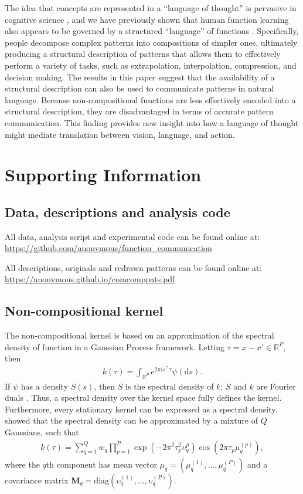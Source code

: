 \documentclass[a4paper,man, floatsintext, natbib]{apa6}
\begin{document}
The idea that concepts are represented in a ``language of thought'' is pervasive in cognitive science \citep{fodor1975language,piantadosi2016logical}, and we have previously shown that human function learning also appears to be governed by a structured ``language'' of functions \citep{schulz2017compositional,gershman2017structured}. Specifically, people decompose complex patterns into compositions of simpler ones, ultimately producing a structural description of patterns that allows them to effectively perform a variety of tasks, such as extrapolation, interpolation, compression, and decision making. The results in this paper suggest that the availability of a structural description can also be used to communicate patterns in natural language. Because non-compositional functions are less effectively encoded into a structural description, they are disadvantaged in terms of accurate pattern communication. This finding provides new insight into how a language of thought might mediate translation between vision, language, and action.

\section{Supporting Information}

\subsection{Data, descriptions and analysis code}
All data, analysis script and experimental code can be found online at:\\ \url{https://github.com/anonymous/function_communication}

\noindent
All descriptions, originals and redrawn patterns can be found online at:\\ \url{https://anonymous.github.io/comcomppats.pdf}

\subsection{Non-compositional kernel}
The non-compositional kernel is based on an approximation of the spectral density of function in a Gaussian Process framework. Letting $\tau=x-x' \in \mathbb{R}^P$, then
\begin{align}
k(\tau)=\int_{\mathbb{R}^P} e^{2\pi i s^\top \tau}  \psi( \text{d} s ).
\end{align}
If $\psi$ has a density $S(s)$, then $S$ is the spectral density of $k$; $S$ and $k$ are Fourier duals \citep{rasmussen2006gaussian}. Thus, a spectral density over the kernel space fully defines the kernel. Furthermore, every stationary kernel can be expressed as a spectral density. \cite{wilson2013gaussian} showed that the spectral density can be approximated by a mixture of $Q$ Gaussians, such that
\begin{align}
k(\tau)=\sum_{q=1}^{Q}w_q\prod_{p=1}^{P}\exp\left(-2\pi^2\tau_p^2\upsilon_q^{p}\right)\cos\left(2\pi\tau_p\mu_q^{(p)}\right),
\end{align}
where the $q$th component has mean vector $\mu_q=\left(\mu_q^{(1)}, \dots, \mu_q^{(P)}\right)$ and a covariance matrix $\mathbf{M}_q=\text{diag}\left(\upsilon_q^{(1)}, \dots, \upsilon_q^{(P)}\right)$.
\end{document}
